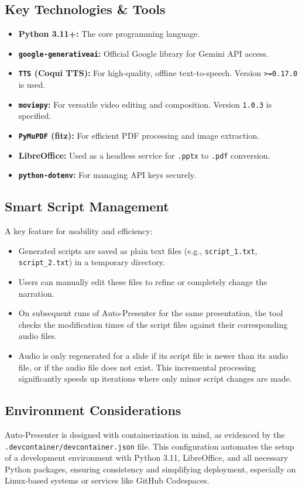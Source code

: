 \documentclass{article}
\begin{document}
\subsection{Key Technologies & Tools}
\begin{itemize}
    \item \textbf{Python 3.11+:} The core programming language.
    \item \textbf{\texttt{google-generativeai}:} Official Google library for Gemini API access.
    \item \textbf{\texttt{TTS} (Coqui TTS):} For high-quality, offline text-to-speech. Version \texttt{>=0.17.0} is used.
    \item \textbf{\texttt{moviepy}:} For versatile video editing and composition. Version \texttt{1.0.3} is specified.
    \item \textbf{\texttt{PyMuPDF} (fitz):} For efficient PDF processing and image extraction.
    \item \textbf{LibreOffice:} Used as a headless service for \texttt{.pptx} to \texttt{.pdf} conversion.
    \item \textbf{\texttt{python-dotenv}:} For managing API keys securely.
\end{itemize}

\subsection{Smart Script Management}
A key feature for usability and efficiency:
\begin{itemize}
    \item Generated scripts are saved as plain text files (e.g., \texttt{script\_1.txt}, \texttt{script\_2.txt}) in a temporary directory.
    \item Users can manually edit these files to refine or completely change the narration.
    \item On subsequent runs of Auto-Presenter for the same presentation, the tool checks the modification times of the script files against their corresponding audio files.
    \item Audio is only regenerated for a slide if its script file is newer than its audio file, or if the audio file does not exist. This incremental processing significantly speeds up iterations where only minor script changes are made.
\end{itemize}

\subsection{Environment Considerations}
Auto-Presenter is designed with containerization in mind, as evidenced by the \texttt{.devcontainer/devcontainer.json} file. This configuration automates the setup of a development environment with Python 3.11, LibreOffice, and all necessary Python packages, ensuring consistency and simplifying deployment, especially on Linux-based systems or services like GitHub Codespaces.
\end{document}
